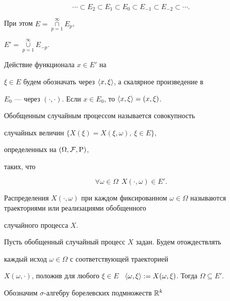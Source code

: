$$


\dotsb\subset E_2\subset E_1\subset E_0\subset E_{-1}\subset


E_{-2}\subset\dotsb.


$$


При этом $E=\mathop{\cap}\limits_{p=1}^{\infty}E_p$,


$E'=\mathop{\cup}\limits_{p=1}^{\infty}E_{-p}$. 


Действие функционала $x\in E'$ на


$\xi\in E$ будем обозначать через $\langle x,\xi\rangle$, а скалярное произведение в


$E_0$ --- через $(\cdot,


\cdot)$. Если $x\in E_0$, то $\la x,\xi\ra=(x,\xi)$.








\begin{defn}


Обобщенным случайным процессом называется совокупность


случайных величин $\{X(\xi)=X(\xi,\omega),\ \xi\in E\}$,


определенных на $ (\Omega, {\cal F}, \mathrm{P})$,


таких, что


$$


\forall \omega \in \Omega \ \ X(\cdot,\omega) \in E'.


$$


\end{defn}





Распределения $X(\cdot,\omega)$ при каждом фиксированном $\omega


\in \Omega$ называются траекториями или реализациями обобщенного


случайного процесса $X$.





Пусть обобщенный случайный процесс $X$ задан. Будем отождествлять


каждый исход $\omega\in\Omega$ с соответствующей траекторией


$X(\omega, \cdot)$, положив для любого $\xi\in E$ \ $\la \omega,


\xi\ra  := X(\omega, \xi)$. Тогда $\Omega\subseteq E'$.





Обозначим $\sigma$-алгебру борелевских подмножеств $\Bbb{R}^k$


